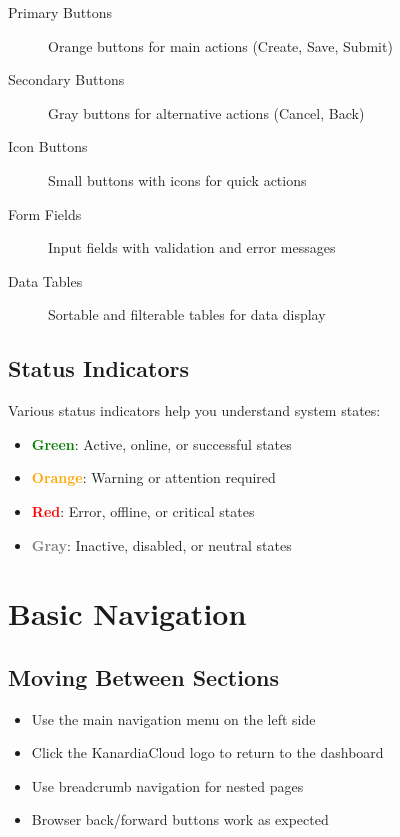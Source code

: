 \begin{description}
    \item[Primary Buttons] Orange buttons for main actions (Create, Save, Submit)
    \item[Secondary Buttons] Gray buttons for alternative actions (Cancel, Back)
    \item[Icon Buttons] Small buttons with icons for quick actions
    \item[Form Fields] Input fields with validation and error messages
    \item[Data Tables] Sortable and filterable tables for data display
\end{description}

\subsection{Status Indicators}

Various status indicators help you understand system states:

\begin{itemize}
    \item \textcolor{green}{\textbf{Green}}: Active, online, or successful states
    \item \textcolor{orange}{\textbf{Orange}}: Warning or attention required
    \item \textcolor{red}{\textbf{Red}}: Error, offline, or critical states
    \item \textcolor{gray}{\textbf{Gray}}: Inactive, disabled, or neutral states
\end{itemize}

\section{Basic Navigation}

\subsection{Moving Between Sections}

\begin{itemize}
    \item Use the main navigation menu on the left side
    \item Click the KanardiaCloud logo to return to the dashboard
    \item Use breadcrumb navigation for nested pages
    \item Browser back/forward buttons work as expected
\end{itemize}


